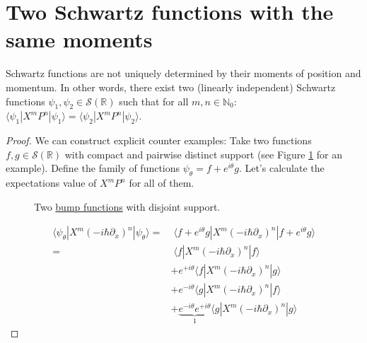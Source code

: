 \documentclass{techbrief}
\begin{document}
\section{Two Schwartz functions with the same moments}
\begin{thrm}
    Schwartz functions are not uniquely determined by their moments of position and momentum. In other words, there exist two (linearly independent) Schwartz functions $\psi_1, \psi_2 \in \mathcal{S}(\mathbb{R})$ such that for all $m, n \in \mathbb{N}_0$: $\langle \psi_1 | X^m P^n | \psi_1 \rangle = \langle \psi_2 | X^m P^n | \psi_2 \rangle$.
\end{thrm}
\begin{proof}
    We can construct explicit counter examples:
    Take two functions $f, g \in \mathcal{S}(\mathbb{R})$ with compact and pairwise distinct support (see Figure \ref{fig:bumps} for an example). Define the family of functions $\psi_\theta = f + e^{i \theta} g$. Let's calculate the expectations value of $X^m P^n$ for all of them.
    \begin{figure}[h]
        \centering
        \caption{Two \href{https://en.wikipedia.org/wiki/Bump_function}{bump functions} with disjoint support.}
        \label{fig:bumps}
    \end{figure}
    \begin{equation}
        \begin{split}
            \langle \psi_\theta | X^m (-i \hbar \partial_x)^n | \psi_\theta \rangle =&\; \langle f + e^{i \theta} g | X^m (-i \hbar \partial_x)^n | f + e^{i \theta} g \rangle \\
            =&\; \langle f  | X^m (-i \hbar \partial_x)^n | f \rangle \\
            &+ e^{+i \theta} \langle f | X^m (-i \hbar \partial_x)^n | g \rangle \\
            &+ e^{-i \theta} \langle g | X^m (-i \hbar \partial_x)^n | f \rangle \\
            &+ \underbrace{e^{-i \theta} e^{+i \theta}}_{1} \langle g | X^m (-i \hbar \partial_x)^n | g \rangle

\end{split}
\end{equation}
\end{proof}
\end{document}
